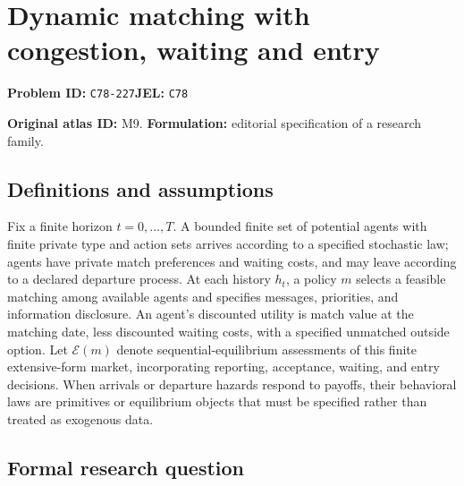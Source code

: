 \documentclass[11pt,a4paper]{article}
\begin{document}
\section*{Dynamic matching with congestion, waiting and entry}
\textbf{Problem ID:} \texttt{C78-227}\quad \textbf{JEL:} \texttt{C78}\par
\label{problem:OP-0009}
\label{atlas:prob:M9}

\noindent\textbf{Original atlas ID:} M9. \textbf{Formulation:} editorial specification of a research family.

\subsection*{Definitions and assumptions}

Fix a finite horizon $t=0,\ldots,T$. A bounded finite set of potential agents with finite private type and action sets arrives according to a specified stochastic law; agents have private match preferences and waiting costs, and may leave according to a declared departure process. At each history $h_t$, a policy $m$ selects a feasible matching among available agents and specifies messages, priorities, and information disclosure. An agent's discounted utility is match value at the matching date, less discounted waiting costs, with a specified unmatched outside option. Let $\mathcal E(m)$ denote sequential-equilibrium assessments of this finite extensive-form market, incorporating reporting, acceptance, waiting, and entry decisions. When arrivals or departure hazards respond to payoffs, their behavioral laws are primitives or equilibrium objects that must be specified rather than treated as exogenous data.

\subsection*{Formal research question}
\end{document}
